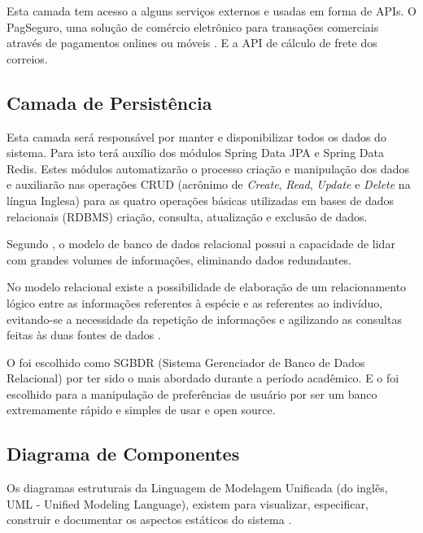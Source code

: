 \documentclass[a4paper,12pt]{monografia}
\begin{document}
Esta camada tem acesso a alguns serviços externos e usadas em forma de APIs. O PagSeguro, uma solução de comércio eletrônico para transações comerciais através de pagamentos onlines ou móveis \cite{pagseguro}. E a API de cálculo de frete dos correios.


\subsection{Camada de Persistência} %
\label{sub:camada_de_persistencia}

Esta camada será responsável por manter e disponibilizar todos os dados do sistema. Para isto terá auxílio dos módulos Spring Data JPA e Spring Data Redis. Estes módulos automatizarão o processo criação e manipulação dos dados e auxiliarão  nas operações CRUD (acrônimo de \textit{Create}, \textit{Read}, \textit{Update} e \textit{Delete} na língua Inglesa) para as quatro operações básicas utilizadas em bases de dados relacionais (RDBMS) criação, consulta, atualização e exclusão de dados.

Segundo , o modelo de banco de dados relacional possui a capacidade de lidar com grandes volumes de informações, eliminando dados redundantes. 

\begin{citacao}
	No modelo relacional existe a possibilidade de elaboração de um relacionamento lógico entre as informações referentes à espécie e as referentes ao indivíduo, evitando-se a necessidade da repetição de informações e agilizando as consultas feitas às duas fontes de dados \cite{da2002banco}.
\end{citacao}

O  foi escolhido como SGBDR (Sistema Gerenciador de Banco de Dados Relacional) por ter sido o mais abordado durante a período acadêmico. E o  foi escolhido para a manipulação de preferências de usuário por ser um banco extremamente rápido e simples de usar e open source.



\subsection{Diagrama de Componentes} %
\label{sub:diagrama_de_componentes}

Os diagramas estruturais da Linguagem de Modelagem Unificada (do inglês, UML - Unified Modeling Language), existem para visualizar, especificar, construir e documentar os aspectos estáticos do sistema \cite{booch2006uml}. 
\end{document}

